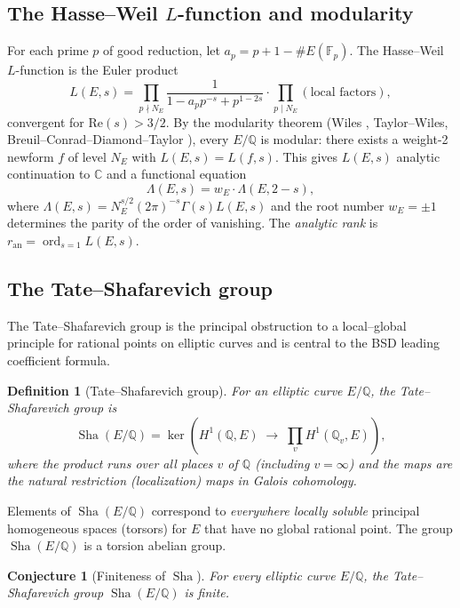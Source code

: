 \documentclass[11pt]{article}
\newtheorem{definition}[theorem]{Definition}
\newtheorem{conjecture}[theorem]{Conjecture}
\DeclareMathOperator{\ord}{ord}
\DeclareMathOperator{\Sha}{Sha}
\begin{document}
\subsection{The Hasse--Weil $L$-function and modularity}

For each prime $p$ of good reduction, let $a_p = p + 1 - \#E(\mathbb{F}_p)$.
The Hasse--Weil $L$-function is the Euler product
\[
  L(E,s) = \prod_{p \nmid N_E}
    \frac{1}{1 - a_p p^{-s} + p^{1 - 2s}}
    \cdot \prod_{p \mid N_E} (\text{local factors}),
\]
convergent for $\mathrm{Re}(s) > 3/2$.  By the modularity theorem (Wiles
\cite{Wiles}, Taylor--Wiles, Breuil--Conrad--Diamond--Taylor \cite{BCDT}),
every $E/\mathbb{Q}$ is modular: there exists a weight-2 newform $f$ of level
$N_E$ with $L(E,s) = L(f,s)$.  This gives $L(E,s)$ analytic continuation to
$\mathbb{C}$ and a functional equation
\[
  \Lambda(E,s) = w_E \cdot \Lambda(E, 2-s),
\]
where $\Lambda(E,s) = N_E^{s/2}(2\pi)^{-s}\Gamma(s)L(E,s)$ and the root number
$w_E = \pm 1$ determines the parity of the order of vanishing.  The
\emph{analytic rank} is $r_{\mathrm{an}} = \ord_{s=1} L(E,s)$.

\subsection{The Tate--Shafarevich group}
\label{subsec:sha}

The Tate--Shafarevich group is the principal obstruction to a local--global
principle for rational points on elliptic curves and is central to the BSD
leading coefficient formula.

\begin{definition}[Tate--Shafarevich group]
For an elliptic curve $E/\mathbb{Q}$, the \emph{Tate--Shafarevich group} is
\[
  \Sha(E/\mathbb{Q}) = \ker\!\left(
    H^1(\mathbb{Q}, E) \;\longrightarrow\;
    \prod_{v} H^1(\mathbb{Q}_v, E)
  \right),
\]
where the product runs over all places $v$ of $\mathbb{Q}$ (including
$v = \infty$) and the maps are the natural restriction (localization) maps
in Galois cohomology.
\end{definition}

\noindent
Elements of $\Sha(E/\mathbb{Q})$ correspond to \emph{everywhere locally
soluble} principal homogeneous spaces (torsors) for $E$ that have no global
rational point.  The group $\Sha(E/\mathbb{Q})$ is a torsion abelian group.

\begin{conjecture}[Finiteness of $\Sha$]
\label{conj:sha-finite}
For every elliptic curve $E/\mathbb{Q}$, the Tate--Shafarevich group
$\Sha(E/\mathbb{Q})$ is finite.
\end{conjecture}
\end{document}

